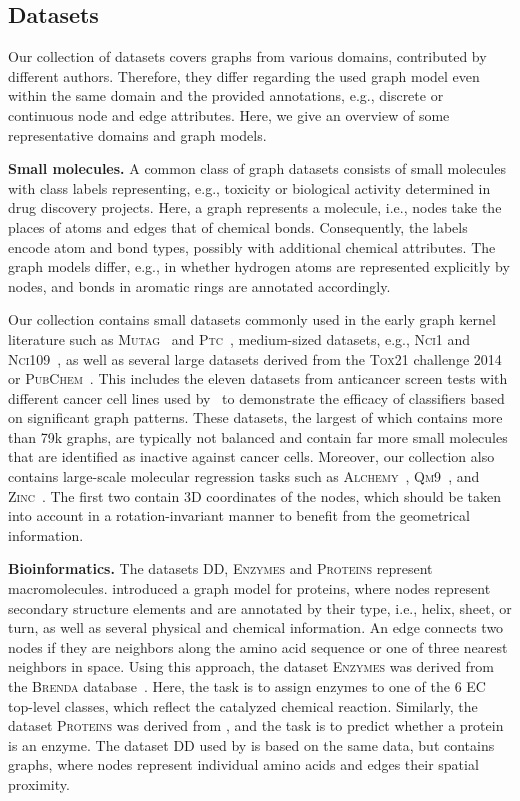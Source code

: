 \documentclass{article}
\newcommand{\xhdr}[1]{{\noindent\bfseries #1}}
\theoremstyle{definition}
\begin{document}
\subsection{Datasets}
Our collection of datasets covers graphs from various domains, contributed by different authors. Therefore, they differ regarding the used graph model even within the same domain and the provided annotations, e.g., discrete or continuous node and edge attributes. Here, we give an overview of some representative domains and graph models.

\xhdr{Small molecules.} 
A common class of graph datasets consists of small molecules with class labels representing, e.g., toxicity or biological activity determined in drug discovery projects. Here, a graph represents a molecule, i.e., nodes take the places of atoms and edges that of chemical bonds. Consequently, the labels encode atom and bond types, possibly with additional chemical attributes. The graph models differ, e.g., in whether hydrogen atoms are represented explicitly by nodes, and bonds in aromatic rings are annotated accordingly.

Our collection contains small datasets commonly used in the early graph kernel literature such as \textsc{Mutag}~\cite{Deb+1991} and \textsc{Ptc}~\cite{Helma2001}, medium-sized datasets, e.g., \textsc{Nci1} and \textsc{Nci109}~\cite{Wal+2008,She+2011}, as well as several large datasets derived from the \textsc{Tox21} challenge 2014 or \textsc{PubChem}~\cite{Kim2018}. This includes the eleven datasets from anticancer screen tests with different cancer cell lines used by~\citet{Yan2008} to demonstrate the efficacy of classifiers based on significant graph patterns. These datasets, the largest of which contains more than 79k graphs, are typically not balanced and contain far more small molecules that are identified as inactive against cancer cells. Moreover, our collection also contains large-scale molecular regression tasks such as \textsc{Alchemy}~\cite{Che+2020}, \textsc{Qm9}~\cite{Ram+2014}, and \textsc{Zinc}~\cite{Dwi+2020,Jin+2018a}. The first two contain 3D coordinates of the nodes, which should be taken into account in a rotation-invariant manner to benefit from the geometrical information.


\xhdr{Bioinformatics.}
The datasets \textsc{DD}, \textsc{Enzymes} and \textsc{Proteins} represent macromolecules. \citet{Bor+2005a} introduced a graph model for proteins, where nodes represent secondary structure elements and are annotated by their type, i.e., helix, sheet, or turn, as well as several physical and chemical information. An edge connects two nodes if they are neighbors along the amino acid sequence or one of three nearest neighbors in space. Using this approach, the dataset \textsc{Enzymes} was derived from the \textsc{Brenda} database~\cite{Schomburg2004}. Here, the task is to assign enzymes to one of the 6 EC top-level classes, which reflect the catalyzed chemical reaction. Similarly, the dataset \textsc{Proteins} was derived from \citep{Dob+2003}, and the task is to predict whether a protein is an enzyme. The dataset \textsc{DD} used by \citet{She+2011} is based on the same data, but contains graphs, where nodes represent individual amino acids and edges their spatial proximity.
\end{document}
